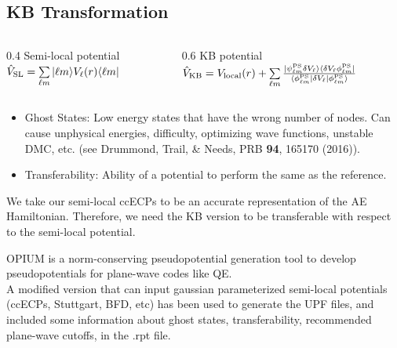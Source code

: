 \subsection{KB Transformation}
\begin{frame}
    \begin{columns}
        \begin{column}
            {0.4\textwidth}
            \centering
            {\color{ForestGreen}Semi-local potential}\\
            $\hat{V}_{\rm SL} = \sum\limits_{\ell m}  | \ell m\rangle V_\ell(r) \langle\ell m|$
        \end{column}
        \begin{column}
            {0.6\textwidth}
            \centering
            {\color{ForestGreen}KB potential}\\
            $\hat{V}_{\rm KB} = V_{\rm local}(r) + \sum\limits_{\ell m} \frac{| \psi_{\ell m}^{\rm PS} \delta V_\ell \rangle \langle \delta V_\ell \phi_{\ell m}^{\rm PS}|}{\langle \phi_{\ell m}^{\rm PS} |\delta V_\ell | \phi_{\ell m}^{\rm PS}\rangle} $
        \end{column}
    \end{columns}
    \bigskip
    \begin{itemize}
        \item[] {\color{NavyBlue} Ghost States:} Low energy states that have the wrong number of nodes. Can cause unphysical energies, difficulty, optimizing wave functions, unstable DMC, etc. (see Drummond, Trail, \& Needs, PRB {\bf 94}, 165170 (2016)).
        \item[] {\color{NavyBlue} Transferability:} Ability of a potential to perform the same as the reference. 
    \end{itemize}
    \bigskip

    We take our semi-local ccECPs to be an accurate representation of the AE Hamiltonian. Therefore, we need the KB version to be transferable with respect to the semi-local potential.

\end{frame}

\begin{frame}
    OPIUM is a norm-conserving pseudopotential generation tool to develop pseudopotentials for plane-wave codes like QE.\\
    \bigskip
    A modified version that can input gaussian parameterized semi-local potentials (ccECPs, Stuttgart, BFD, etc) has been used to generate the UPF files, and included some information about ghost states, transferability, recommended plane-wave cutoffs, in the .rpt file.
\end{frame}

